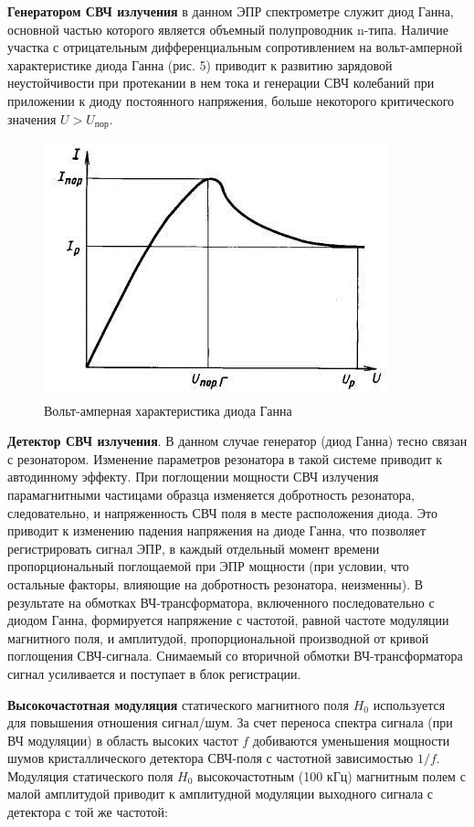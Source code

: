 \documentclass[a4paper,14pt]{article}
\begin{document}
\par
\textbf{Генератором СВЧ излучения} в данном ЭПР спектрометре служит диод Ганна, основной частью которого является объемный полупроводник n-типа. Наличие участка с отрицательным дифференциальным сопротивлением на вольт-амперной характеристике диода Ганна (рис. 5) приводит к развитию зарядовой неустойчивости при протекании в нем тока и генерации СВЧ колебаний при приложении к диоду постоянного напряжения, больше некоторого критического значения $ U > U_{\text{пор}} $.
\begin{figure}
	\centering
	\includegraphics{рис5}
	\caption{Вольт-амперная характеристика диода Ганна}
	\label{fig:5}
\end{figure}
\par
\textbf{Детектор СВЧ излучения}. В данном случае генератор (диод Ганна) тесно связан с резонатором. Изменение параметров резонатора в такой системе приводит к автодинному эффекту. При поглощении мощности СВЧ излучения парамагнитными частицами образца изменяется добротность резонатора, следовательно, и напряженность СВЧ поля в месте расположения диода. Это приводит к изменению падения напряжения на диоде Ганна, что позволяет регистрировать сигнал ЭПР, в каждый отдельный момент времени пропорциональный поглощаемой при ЭПР мощности (при условии, что остальные факторы, влияющие на добротность резонатора, неизменны). В результате на обмотках ВЧ-трансформатора, включенного последовательно с диодом Ганна, формируется напряжение с частотой, равной частоте модуляции магнитного поля, и амплитудой, пропорциональной производной от кривой поглощения СВЧ-сигнала. Снимаемый со вторичной обмотки ВЧ-трансформатора сигнал усиливается и поступает в блок регистрации. 
\par  
\textbf{Высокочастотная модуляция} статического магнитного поля $ H_0 $ используется для повышения отношения сигнал/шум. За счет переноса спектра сигнала (при ВЧ модуляции) в область высоких частот $ f $ добиваются уменьшения мощности шумов кристаллического детектора СВЧ-поля с частотной зависимостью $ 1/f $. Модуляция статического поля $ H_0 $ высокочастотным (100 кГц) магнитным полем с малой амплитудой приводит к амплитудной модуляции выходного сигнала с детектора с той же частотой:
\end{document}

